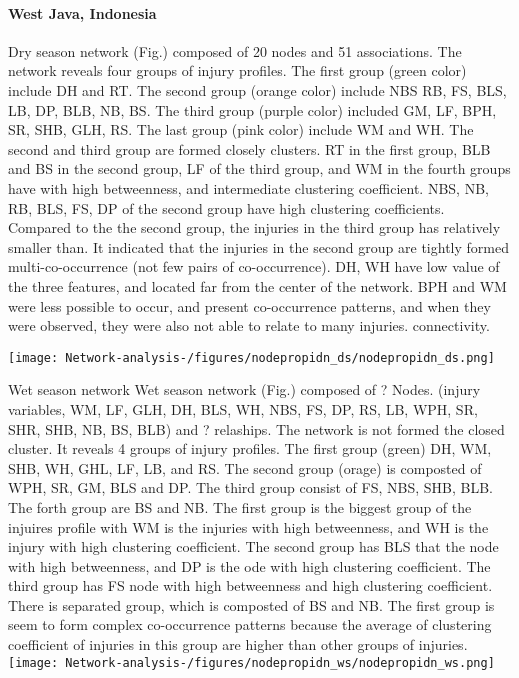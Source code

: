 \paragraph{West Java, Indonesia}
 
Dry season network (Fig.) composed of 20 nodes and 51 associations. The network reveals four groups of injury profiles. The first group (green color) include DH and RT. The second group (orange color) include NBS RB, FS, BLS, LB, DP, BLB, NB, BS. The third group (purple color) included GM, LF, BPH, SR, SHB, GLH, RS. The last group (pink color) include WM and WH.  The second and third group are formed closely clusters.  RT in the first group, BLB and BS in the second group,  LF of the third group, and WM in the fourth groups have with high betweenness, and intermediate clustering coefficient.  NBS, NB, RB, BLS, FS, DP of the second group have high clustering coefficients. Compared to the the second group, the injuries in the third group has relatively smaller than. It indicated that the injuries in the second group are tightly formed multi-co-occurrence (not few pairs of co-occurrence).  DH, WH have low value of the three features, and located far from the center of the network. BPH and WM were less possible to occur, and present co-occurrence patterns, and when they were observed, they were also not able to relate to many injuries. 
connectivity.

\texttt{[image: Network-analysis-/figures/nodepropidn\_ds/nodepropidn\_ds.png]}

Wet season network
Wet season network (Fig.) composed of ? Nodes. (injury variables, WM, LF, GLH, DH, BLS, WH, NBS, FS, DP, RS, LB, WPH, SR, SHR, SHB, NB, BS, BLB) and ? relaships. The network is not formed the closed cluster.   It reveals 4 groups of injury profiles. The first group (green) DH, WM, SHB, WH, GHL, LF, LB, and RS. The second group (orage) is composted of WPH, SR, GM, BLS and DP.  The third group consist of FS, NBS, SHB, BLB. The forth group are BS and NB. The first group is the biggest group of the injuires profile with WM is the injuries with high betweenness, and WH is the injury with high clustering coefficient. The second group has BLS that the node with high betweenness, and DP is the ode with high clustering coefficient. The third group  has FS node with high betweenness and high clustering coefficient. There is separated group, which is composted of BS and NB. The first group is seem to form complex  co-occurrence patterns because the average of clustering coefficient of injuries in this group are higher than other groups of injuries.  
\texttt{[image: Network-analysis-/figures/nodepropidn\_ws/nodepropidn\_ws.png]}

